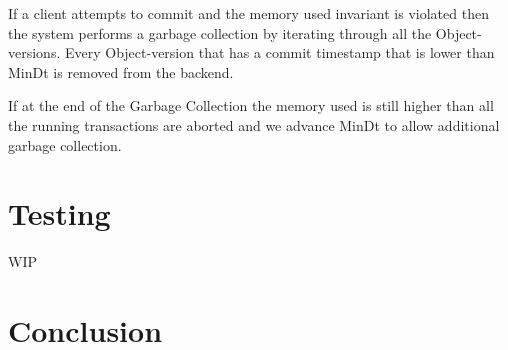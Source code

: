 \documentclass[systeme,french,english]{compas2022}
\begin{document}
If a client attempts to commit and the memory used invariant is violated then the system performs a garbage collection by iterating through all the Object-versions.
Every Object-version that has a commit timestamp that is lower than MinDt is removed from the backend.

If at the end of the Garbage Collection the memory used is still higher than all the running transactions are aborted and we advance MinDt to allow additional garbage collection.

\section{Testing}

WIP










\section{Conclusion}


\end{document}
